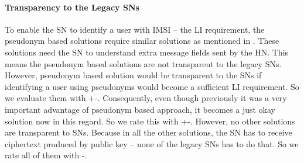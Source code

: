 \documentclass[conference]{IEEEtran}
\begin{document}
\paragraph{Transparency to the Legacy SNs}
To enable the SN to identify a user with IMSI -- the LI requirement, the pseudonym based solutions require similar solutions as mentioned in \cite{NokiaLI,NokiaLI1,EricssonLI,CATTLI,KPNDOCOMOLI}. These solutions need the SN to understand extra message fields sent by the HN. This means the pseudonym based solutions are not transparent to the legacy SNs. However, pseudonym based solution would be transparent to the SNs if identifying a user using pseudonyms would become a sufficient LI requirement. So we evaluate them with +-. Consequently, even though previously it was a very important advantage of pseudonym based approach, it becomes a just okay solution now in this regard. So we rate this with +-. However, no other solutions are transparent to SNs. Because in all the other solutions, the SN has to receive ciphertext produced by public key -- none of the legacy SNs has to do that. So we rate all of them with -.
\end{document}
